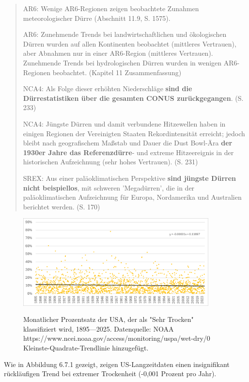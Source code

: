 \documentclass[12pt,paper=a4,DIV=12,parskip=never,chapterprefix=false,headings=standardclasses]{scrreprt}
\begin{document}
\begin{quote}
AR6: Wenige AR6-Regionen zeigen beobachtete Zunahmen meteorologischer Dürre (Abschnitt 11.9, S. 1575).

AR6: Zunehmende Trends bei landwirtschaftlichen und ökologischen Dürren wurden auf allen Kontinenten beobachtet (mittleres Vertrauen), aber Abnahmen nur in einer AR6-Region (mittleres Vertrauen). Zunehmende Trends bei hydrologischen Dürren wurden in wenigen AR6-Regionen beobachtet. (Kapitel 11 Zusammenfassung)

NCA4: Als Folge dieser erhöhten Niederschläge \textbf{sind die Dürrestatistiken über die gesamten CONUS zurückgegangen}. (S. 233)

NCA4: Jüngste Dürren und damit verbundene Hitzewellen haben in einigen Regionen der Vereinigten Staaten Rekordintensität erreicht; jedoch bleibt nach geografischem Maßstab und Dauer die Dust Bowl-Ära \textbf{der 1930er Jahre das Referenzdürre}- und extreme Hitzeereignis in der historischen Aufzeichnung (sehr hohes Vertrauen). (S. 231)

SREX: Aus einer paläoklimatischen Perspektive \textbf{sind jüngste Dürren nicht beispiellos}, mit schweren 'Megadürren', die in der paläoklimatischen Aufzeichnung für Europa, Nordamerika und Australien berichtet werden. (S. 170)
\end{quote}

\begin{figure}[H]
\begin{center}
\includegraphics[width=0.9\textwidth]{bilder/bilderKlima-0061.png}\\[1cm]
\end{center}
\caption{Monatlicher Prozentsatz der USA, der als "Sehr Trocken" klassifiziert wird, 1895—2025. Datenquelle: NOAA https://www.ncei.noaa.gov/access/monitoring/uspa/wet-dry/0 Kleinste-Quadrate-Trendlinie hinzugefügt.}
\end{figure}

Wie in Abbildung 6.7.1 gezeigt, zeigen US-Langzeitdaten einen insignifikant rückläufigen Trend bei extremer Trockenheit (-0,001 Prozent pro Jahr).
\end{document}
